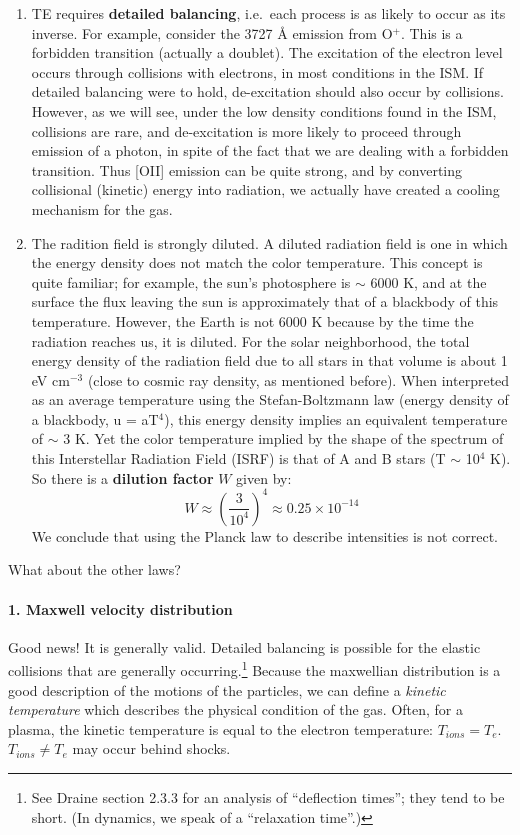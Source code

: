 \documentclass[12pt]{article}
\newcommand{\mar}[1]{\hspace{0pt}\marginpar{-\textcolor{black}{#1}-}}
\begin{document}
\begin{enumerate}
    \item TE requires \textbf{detailed balancing},
        i.e.\ each process is as likely to occur as its inverse. For
        example, consider the 3727 \AA{} emission from O$^{+}$. This is a
        forbidden transition (actually a doublet). The excitation of the
        electron level occurs through collisions with electrons, in most
        conditions in the ISM\@. If detailed balancing were to hold,
        de-excitation should also occur by collisions. However, as we will
        see, under the low density conditions found in the ISM, collisions
        are rare, and de-excitation is more likely to proceed through
        emission of a photon, in spite of the fact that we are dealing with
        a forbidden transition. Thus [OII] emission can be quite strong,
        and by converting collisional (kinetic) energy into radiation, we
        actually have created a cooling mechanism for the gas.
    \item The radition field is strongly diluted. A diluted radiation field
        is one in which the energy density does not match the color
        temperature. This concept is quite familiar; for example, the sun's
        photosphere is $\sim$ 6000 K, and at the surface the flux leaving
        the sun is approximately that of a blackbody of this temperature.
        However, the Earth is not 6000 K because by the time the radiation
        reaches us, it is diluted. \mar{20}For the solar neighborhood, the
        total energy density of the radiation field due to all stars in
        that volume is about 1 eV cm$^{-3}$ (close to cosmic ray density,
        as mentioned before). When interpreted as an average temperature
        using the Stefan-Boltzmann law (energy density of a blackbody, u =
        aT$^{4}$), this energy density implies an equivalent temperature of
        $\sim$ 3 K. Yet the color temperature implied by the shape of the
        spectrum of this Interstellar Radiation Field (ISRF) is that of A
        and B stars (T $\sim$ 10$^{4}$ K). So there is a \textbf{dilution
        factor} $W$ given by:
        \[
            W \approx \left( \frac{3}{10^{4}} \right) ^{4}
              \approx 0.25\times10^{-14}
            \]
        We conclude that using the Planck law to
        describe intensities is not correct.
\end{enumerate}
What about the other laws?

\paragraph{1. Maxwell velocity distribution} Good news! It is generally
valid. Detailed balancing is possible for the elastic collisions that are
generally occurring.\footnote{
    See Draine section 2.3.3 for an analysis of ``deflection times''; they
    tend to be short. (In dynamics, we speak of a ``relaxation time''.)}
Because the maxwellian distribution is a good
description of the motions of the particles, we can define a \textit{kinetic
temperature} which describes the physical condition of the gas. Often,
for a plasma, the kinetic temperature is equal to the electron temperature:
$T_{ions} = T_{e}$. $T_{ions} \neq T_{e}$ may occur behind shocks.
\end{document}
